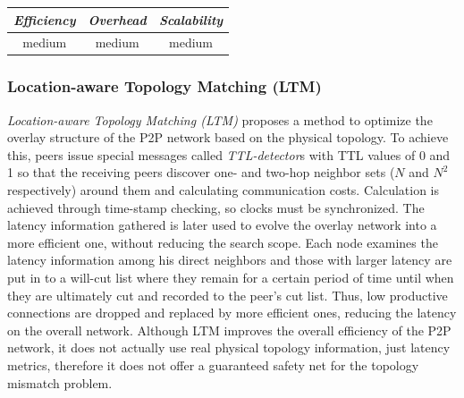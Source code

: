 
\begin{center}
\begin{tabular}{ccc}
\emph{Efficiency} & \emph{Overhead} & \emph{Scalability} \\
\hline
medium &
medium &
medium
\end{tabular}
\end{center}

\subsubsection{Location-aware Topology Matching (LTM)}
\emph{Location-aware Topology Matching (LTM)} \cite{LLXNZ2004} proposes a
method to optimize the overlay structure of the P2P network based on the
physical topology. To achieve this, peers issue special messages called
\textit{TTL-detector}s with TTL values of 0 and 1 so that the receiving peers
discover one- and two-hop neighbor sets ($N$ and $N^2$ respectively) around
them and calculating communication costs. Calculation is achieved through
time-stamp checking, so clocks must be synchronized. The latency information
gathered is later used to evolve the overlay network into a more efficient one,
without reducing the search scope. Each node examines the latency information
among his direct neighbors and those with larger latency are put in to a
will-cut list where they remain for a certain period of time until when they are
ultimately cut and recorded to the peer's cut list. Thus, low productive
connections are dropped and replaced by more efficient ones, reducing the
latency on the overall network. Although LTM improves the overall efficiency of
the P2P network, it does not actually use real physical topology information,
just latency metrics, therefore it does not offer a guaranteed safety net for
the topology mismatch problem.

